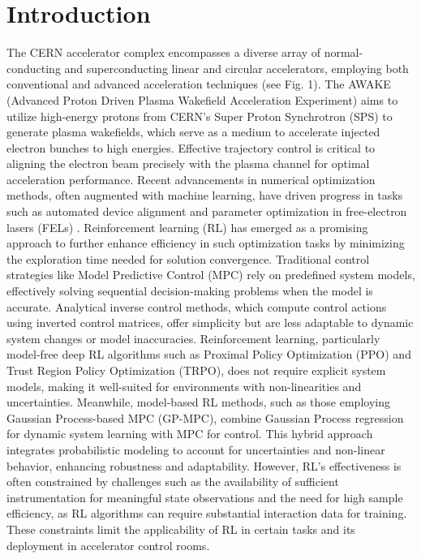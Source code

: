\documentclass[journal,article,submit,pdftex,moreauthors]{Definitions/mdpi}
\begin{document}
\section{Introduction}
The CERN accelerator complex encompasses a diverse array of normal-conducting and superconducting linear and circular accelerators, employing both conventional and advanced acceleration techniques (see Fig. 1)\cite{Scheinker2020,KainVerena2023}. The AWAKE (Advanced Proton Driven Plasma Wakefield Acceleration Experiment) aims to utilize high-energy protons from CERN’s Super Proton Synchrotron (SPS) to generate plasma wakefields, which serve as a medium to accelerate injected electron bunches to high energies. Effective trajectory control is critical to aligning the electron beam precisely with the plasma channel for optimal acceleration performance. Recent advancements in numerical optimization methods, often augmented with machine learning, have driven progress in tasks such as automated device alignment and parameter optimization in free-electron lasers (FELs) \cite{ref-journal}. Reinforcement learning (RL) has emerged as a promising approach to further enhance efficiency in such optimization tasks by minimizing the exploration time needed for solution convergence.
Traditional control strategies like Model Predictive Control (MPC) rely on predefined system models, effectively solving sequential decision-making problems when the model is accurate. Analytical inverse control methods, which compute control actions using inverted control matrices, offer simplicity but are less adaptable to dynamic system changes or model inaccuracies. Reinforcement learning, particularly model-free deep RL algorithms such as Proximal Policy Optimization (PPO) and Trust Region Policy Optimization (TRPO), does not require explicit system models, making it well-suited for environments with non-linearities and uncertainties. Meanwhile, model-based RL methods, such as those employing Gaussian Process-based MPC (GP-MPC), combine Gaussian Process regression for dynamic system learning with MPC for control. This hybrid approach integrates probabilistic modeling to account for uncertainties and non-linear behavior, enhancing robustness and adaptability. However, RL’s effectiveness is often constrained by challenges such as the availability of sufficient instrumentation for meaningful state observations and the need for high sample efficiency, as RL algorithms can require substantial interaction data for training. These constraints limit the applicability of RL in certain tasks and its deployment in accelerator control rooms.
\end{document}

